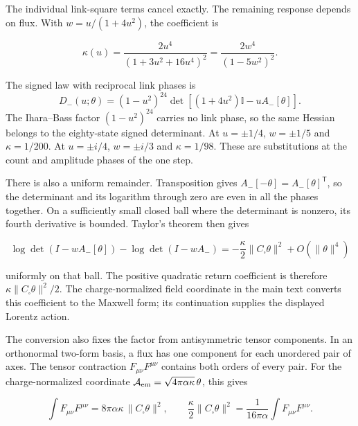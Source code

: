 \documentclass[aps,prx,onecolumn,10pt,notitlepage,nofootinbib,longbibliography]{revtex4-2}
\numberwithin{equation}{section}
\numberwithin{table}{section}
\newcommand{\Id}{\mathbb I}
\begin{document}
The individual link-square terms cancel exactly. The remaining response depends on flux. With \(w=u/(1+4u^2)\), the coefficient is

\begin{equation}
 \kappa(u)=\frac{2u^4}{(1+3u^2+16u^4)^2}
          =\frac{2w^4}{(1-5w^2)^2}.
 \label{eq:proof-SCa-7}
\end{equation}

The signed law with reciprocal link phases is
\begin{equation}
 D_-(u;\theta)=(1-u^2)^{24}
 \det[(1+4u^2)\Id-uA_-[\theta]].
 \label{eq:signedlinkdet}
\end{equation}
The Ihara--Bass factor \((1-u^2)^{24}\) carries no link phase, so the same Hessian belongs to the eighty-state signed determinant. At \(u=\pm1/4\), \(w=\pm1/5\) and \(\kappa=1/200\). At \(u=\pm i/4\), \(w=\pm i/3\) and \(\kappa=1/98\). These are substitutions at the count and amplitude phases of the one step.

There is also a uniform remainder. Transposition gives \({A_-}[-\theta]={A_-}[\theta]^{\mathsf T}\), so the determinant and its logarithm through zero are even in all the phases together. On a sufficiently small closed ball where the determinant is nonzero, its fourth derivative is bounded. Taylor's theorem then gives

\begin{equation}
 \log\det(I-w{A_-}[\theta])-\log\det(I-w{A_-})
   =-\frac\kappa2\|C_\square\theta\|^2+O(\|\theta\|^4)
 \label{eq:proof-SCa-8}
\end{equation}

uniformly on that ball. The positive quadratic return coefficient is therefore \(\kappa\|C_\square\theta\|^2/2\). The charge-normalized field coordinate in the main text converts this coefficient to the Maxwell form; its continuation supplies the displayed Lorentz action.

The conversion also fixes the factor from antisymmetric tensor components. In an orthonormal two-form basis, a flux has one component for each unordered pair of axes. The tensor contraction \(F_{\mu\nu}F^{\mu\nu}\) contains both orders of every pair. For the charge-normalized coordinate \(\mathcal A_{\rm em}=\sqrt{4\pi\alpha\kappa}\,\theta\), this gives

\begin{equation}
 \int F_{\mu\nu}F^{\mu\nu}
     =8\pi\alpha\kappa\,\|C_\square\theta\|^2,\qquad
 \frac{\kappa}{2}\|C_\square\theta\|^2
     =\frac1{16\pi\alpha}\int F_{\mu\nu}F^{\mu\nu}.
 \label{eq:proof-SCa-9}
\end{equation}
\end{document}
